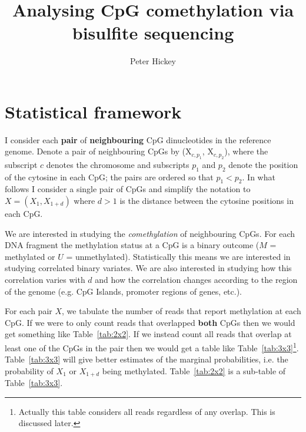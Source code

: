 \documentclass[a4paper]{article}
\title{Analysing CpG comethylation via bisulfite sequencing}
\author{Peter Hickey \\
}
\date{
  \begin{center}
	\today 
	\end{center}
}
\begin{document}
\maketitle

\tableofcontents

\section{Statistical framework}
I consider each \textbf{pair} of \textbf{neighbouring} CpG dinucleotides in the reference genome. Denote a pair of neighbouring CpGs by (X$_{c,p_1}$, X$_{c,p_2}$), where the subscript $c$ denotes the chromosome and subscripts $p_1$ and $p_2$ denote the position of the cytosine in each CpG; the pairs are ordered so that $p_1 < p_2$. In what follows I consider a single pair of CpGs and simplify the notation to $X = (X_1, X_{1+d})$ where $d > 1$ is the distance between the cytosine positions in each CpG.

We are interested in studying the \emph{comethylation} of neighbouring CpGs. For each DNA fragment the methylation status at a CpG is a binary outcome ($M$ = methylated or $U$ = unmethylated). Statistically this means we are interested in studying correlated binary variates. We are also interested in studying how this correlation varies with $d$ and how the correlation changes according to the region of the genome (e.g. CpG Islands, promoter regions of genes, etc.).

For each pair $X$, we tabulate the number of reads that report methylation at each CpG. If we were to only count reads that overlapped \textbf{both} CpGs then we would get something like Table~\ref{tab:2x2}. If we instead count all reads that overlap at least one of the CpGs in the pair then we would get a table like Table~\ref{tab:3x3}\footnote{Actually this table considers all reads regardless of any overlap. This is discussed later.}. Table~\ref{tab:3x3} will give better estimates of the marginal probabilities, i.e. the probability of $X_1$ or $X_{1+d}$ being methylated. Table~\ref{tab:2x2} is a sub-table of Table~\ref{tab:3x3}.
\end{document}
